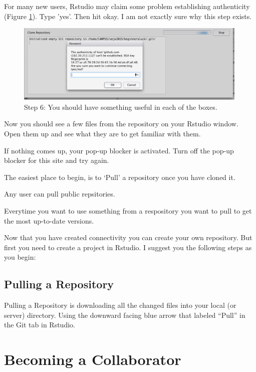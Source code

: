 \documentclass[12pt]{../SOP4_alpha}\usepackage[]{graphicx}\usepackage[]{color}
\begin{document}
\NP For many new users, Rstudio may claim some problem establishing authenticity (Figure \ref{fig:step6}). Type 'yes'. Then hit okay. I am not exactly sure why this step exists. 

\begin{figure}[H]
\centering
\includegraphics[width=0.99\textwidth]{graphics/Authenticity.jpg}
\caption{Step 6: You should have something useful in each of the boxes.}
\label{fig:step6}
\end{figure}


\NP Now you should see a few files from the repository on your Rstudio window. Open them up and see what they are to get familiar with them.

\NP If nothing comes up, your pop-up blocker is activated. Turn off the pop-up blocker for this site and try again. 

\NP The easiest place to begin, is to `Pull' a repository once you have cloned it. 

\NP Any user can pull public repsitories. 

\NP Everytime you want to use something from a respository you want to pull to get the most up-to-date versions. 

\NP Now that you have created connectivity you can create your own repository. But first you need to create a project in Rstudio. I suggest you the following steps as you begin:


\subsection{Pulling a Repository}

\NP Pulling a Repository is downloading all the changed files into your local (or server) directory. Using the downward facing blue arrow that labeled ``Pull'' in the Git tab in Rstudio.

\section{Becoming a Collaborator}
\end{document}
